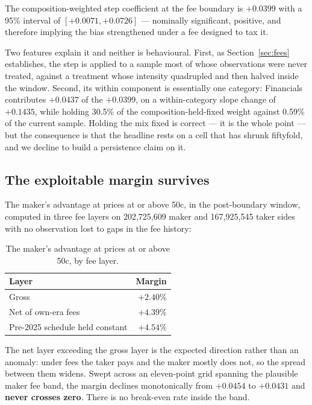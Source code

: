 \documentclass[preprint,12pt,authoryear]{elsarticle}
\begin{document}
The composition-weighted step coefficient at the fee boundary is $+0.0399$ with
a 95\% interval of $[+0.0071, +0.0726]$ --- nominally significant, positive, and
therefore implying the bias strengthened under a fee designed to tax it.

Two features explain it and neither is behavioural. First, as
Section~\ref{sec:fees} establishes, the step is applied to a sample most of
whose observations were never treated, against a treatment whose intensity
quadrupled and then halved inside the window. Second, its within component is
essentially one category: Financials contributes $+0.0437$ of the $+0.0399$, on
a within-category slope change of $+0.1435$, while holding 30.5\% of the
composition-held-fixed weight against 0.59\% of the current sample. Holding the
mix fixed is correct --- it is the whole point --- but the consequence is that
the headline rests on a cell that has shrunk fiftyfold, and we decline to build
a persistence claim on it.

\subsection{The exploitable margin survives}\label{sec:margin}

The maker's advantage at prices at or above 50c, in the post-boundary window,
computed in three fee layers on 202,725,609 maker and 167,925,545 taker sides
with no observation lost to gaps in the fee history:

\begin{table}[htbp]
\centering
\caption{The maker's advantage at prices at or above 50c, by fee layer.}
\begin{tabular}{lr}
\toprule
Layer & Margin \\
\midrule
Gross & \textbf{$+2.40\%$} \\
Net of own-era fees & $+4.39\%$ \\
Pre-2025 schedule held constant & $+4.54\%$ \\
\bottomrule
\end{tabular}
\end{table}

The net layer exceeding the gross layer is the expected direction rather than an
anomaly: under fees the taker pays and the maker mostly does not, so the spread
between them widens. Swept across an eleven-point grid spanning the plausible
maker fee band, the margin declines monotonically from $+0.0454$ to $+0.0431$
and \textbf{never crosses zero}. There is no break-even rate inside the band.
\end{document}
